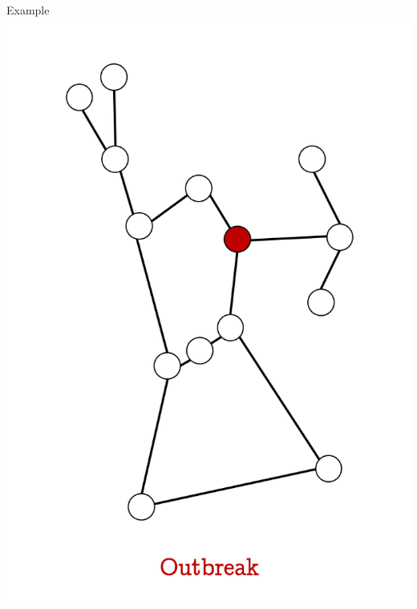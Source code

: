 \documentclass[unknownkeysallowed]{beamer}
\begin{document}
\begin{frame}{Example}
\centering\includegraphics[height=0.8\textheight]{assets/eg-fire/1}
\end{frame}
\end{document}
